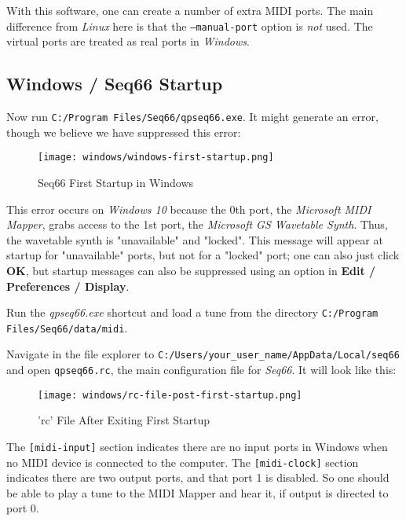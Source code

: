    With this software, one can create a number of extra MIDI ports.
   The main difference from \textsl{Linux} here is that the
   \texttt{--manual-port} option is \textsl{not} used.
   The virtual ports are treated as real ports in \textsl{Windows}.

\subsection{Windows / Seq66 Startup}
\label{subsec:windows_seq66_startup}

   Now run \texttt{C:/Program Files/Seq66/qpseq66.exe}.
   It might generate an error, though we believe we have suppressed
   this error:

\begin{figure}[H]
   \centering 
   \texttt{[image: windows/windows-first-startup.png]}
   \caption{Seq66 First Startup in Windows}
   \label{fig:windows_first_startup}
\end{figure}

   This error occurs on \textsl{Windows 10} because the 0th port, the
   \textsl{Microsoft MIDI Mapper}, grabs access to the 1st port, the
   \textsl{Microsoft GS Wavetable Synth}.
   Thus, the wavetable synth is "unavailable" and "locked".
   This message will appear at startup for "unavailable" ports,
   but not for a "locked" port; one can also just click
   \textbf{OK}, but startup messages can also be suppressed using an option in
   \textbf{Edit / Preferences / Display}.

   Run the \textsl{qpseq66.exe} shortcut and load a tune from the
   directory \texttt{C:/Program Files/Seq66/data/midi}.

   Navigate in the file explorer to
   \texttt{C:/Users/your\_user\_name/AppData/Local/seq66} and open
   \texttt{qpseq66.rc}, the main configuration file for \textsl{Seq66}.
   It will look like this:

\begin{figure}[H]
   \centering 
   \texttt{[image: windows/rc-file-post-first-startup.png]}
   \caption{'rc' File After Exiting First Startup}
   \label{fig:windows_rc_file_post_first_startup}
\end{figure}

   The \texttt{[midi-input]} section indicates there are no input ports
   in Windows when no MIDI device is connected to the computer.
   The \texttt{[midi-clock]} section indicates there are two output
   ports, and that port 1 is disabled.   So one should be able to
   play a tune to the MIDI Mapper and hear it, if output is directed
   to port 0.

